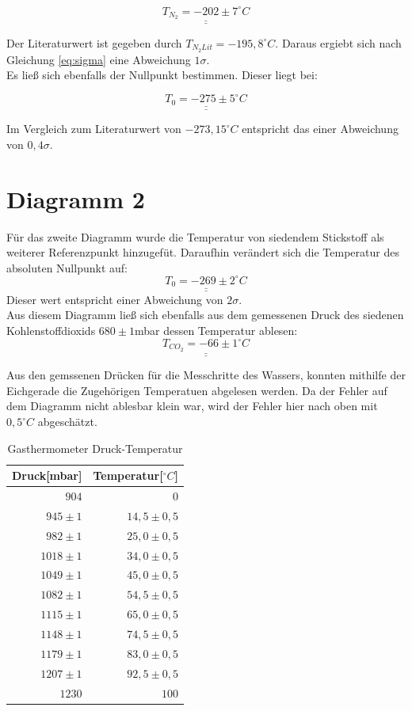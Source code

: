 \[\underline{\underline{T_{N_2} = -202 \pm 7 ^\circ C}}\]

Der Literaturwert ist gegeben durch $T_{N_2 Lit} = -195, 8 ^\circ C$. Daraus ergiebt sich
nach Gleichung \ref{eq:sigma}  eine Abweichung $1 \sigma$.\\
Es ließ sich ebenfalls der Nullpunkt bestimmen. Dieser liegt bei:

\[\underline{\underline{T_0= -275 \pm 5 ^\circ C}}\]

Im Vergleich zum Literaturwert von $-273,15^\circ C$  entspricht das einer Abweichung von $0,4 \sigma$.

\section{Diagramm 2}
Für das zweite Diagramm wurde die Temperatur von siedendem Stickstoff als weiterer Referenzpunkt hinzugefüt.
Daraufhin verändert sich die Temperatur des absoluten Nullpunkt auf:
\[ \underline{\underline{T_0 = -269 \pm 2 ^\circ C}}\]
Dieser wert entspricht einer Abweichung von $2 \sigma$.\\
Aus diesem Diagramm ließ sich ebenfalls aus dem gemessenen Druck des siedenen Kohlenstoffdioxids $680\pm 1$mbar dessen
Temperatur ablesen:
\[\underline{\underline{T_{CO_2}= - 66 \pm 1 ^\circ C}}\]

Aus den gemssenen Drücken für die Messchritte des Wassers, konnten mithilfe der Eichgerade die Zugehörigen Temperatuen abgelesen werden.
Da der Fehler auf dem Diagramm nicht ablesbar klein war, wird der Fehler hier nach oben mit $0,5 ^\circ C$ abgeschätzt.

\begin{table}[h!]
    \centering
    \caption{Gasthermometer Druck-Temperatur}
    \begin{tabular}{r r}
        \toprule
        Druck[mbar] & Temperatur[$^\circ C$]\\
        \midrule
        $904$ & $0$ \\
        $945 \pm 1$ & $14,5 \pm 0,5$ \\
        $982\pm 1$  & $25,0 \pm 0,5 $ \\
        $1018\pm 1$ & $34,0 \pm 0,5 $ \\
        $1049\pm 1$ & $45,0 \pm 0,5$ \\
        $1082\pm 1$ & $54,5 \pm 0,5 $ \\
        $1115\pm 1$ & $65,0 \pm 0,5 $  \\
        $1148\pm 1$ & $74,5 \pm 0,5 $ \\
        $1179\pm 1$ & $83,0 \pm 0,5$ \\
        $1207\pm 1$ & $92,5 \pm 0,5$ \\
        $1230$ & $100$ \\
        \bottomrule


        
    \end{tabular}
\end{table}
\clearpage
\newpage
\clearpage
\newpage

